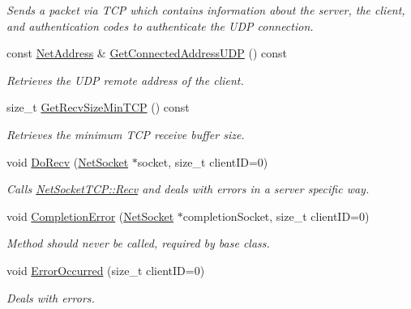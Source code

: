 \begin{DoxyCompactItemize}
\begin{DoxyCompactList}\small\item\em Sends a packet via TCP which contains information about the server, the client, and authentication codes to authenticate the UDP connection. \item\end{DoxyCompactList}\item 
const \hyperlink{class_net_address}{NetAddress} \& \hyperlink{class_net_server_client_a27060047dc420d033f6814142a9174e8}{GetConnectedAddressUDP} () const 
\begin{DoxyCompactList}\small\item\em Retrieves the UDP remote address of the client. \item\end{DoxyCompactList}\item 
size\_\-t \hyperlink{class_net_server_client_adc4b17c01ac55ae92f6d5336f8150aa5}{GetRecvSizeMinTCP} () const 
\begin{DoxyCompactList}\small\item\em Retrieves the minimum TCP receive buffer size. \item\end{DoxyCompactList}\item 
void \hyperlink{class_net_server_client_a61dfce726fc6edcc2afc72f4a6b1e95a}{DoRecv} (\hyperlink{class_net_socket}{NetSocket} $\ast$socket, size\_\-t clientID=0)
\begin{DoxyCompactList}\small\item\em Calls \hyperlink{class_net_socket_t_c_p_a11891910910477cf1eba5fffef8bda52}{NetSocketTCP::Recv} and deals with errors in a server specific way. \item\end{DoxyCompactList}\item 
void \hyperlink{class_net_server_client_a71698dcdd0c469dbe93079b67a0c0afd}{CompletionError} (\hyperlink{class_net_socket}{NetSocket} $\ast$completionSocket, size\_\-t clientID=0)
\begin{DoxyCompactList}\small\item\em Method should never be called, required by base class. \item\end{DoxyCompactList}\item 
void \hyperlink{class_net_server_client_ae84c13e2793afcdd4ede5111abbac887}{ErrorOccurred} (size\_\-t clientID=0)
\begin{DoxyCompactList}\small\item\em Deals with errors. \item\end{DoxyCompactList}\item 

\end{DoxyCompactItemize}
